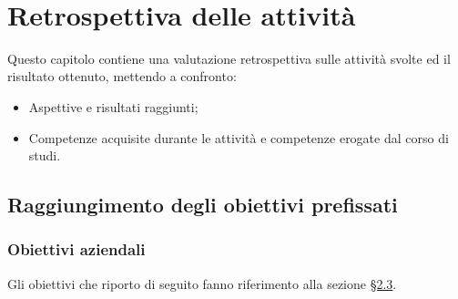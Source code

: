 \newpage \ \thispagestyle{empty} \newpage
\chapter{Retrospettiva delle attività}
\label{cap:resoconto}
Questo capitolo contiene una valutazione retrospettiva sulle attività svolte ed il risultato ottenuto, mettendo a confronto:
\begin{itemize}
    \item Aspettive e risultati raggiunti;
    \item Competenze acquisite durante le attività e competenze erogate dal corso di studi.
\end{itemize}

\section{Raggiungimento degli obiettivi prefissati}

\subsection{Obiettivi aziendali}
Gli obiettivi che riporto di seguito fanno riferimento alla sezione \hyperref[sec:obiettivi-aziendali]{§2.3}.
